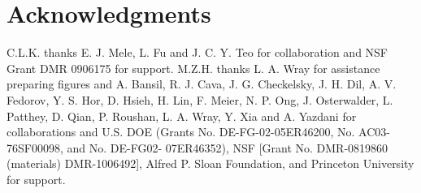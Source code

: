 \documentclass[twocolumn,floatfix,showpacs,rmp,aps]{revtex4}
\begin{document}
	\section*{Acknowledgments} C.L.K. thanks E. J. Mele, L. Fu and
	J. C. Y. Teo for collaboration and NSF Grant DMR 0906175 for support.
	M.Z.H. thanks L. A. Wray for assistance preparing figures and
	A. Bansil, R. J. Cava, J. G. Checkelsky, J. H. Dil, A.
	V. Fedorov, Y. S. Hor, D. Hsieh, H. Lin, F. Meier, N. P. Ong, J.
	Osterwalder, L. Patthey, D. Qian, P. Roushan, L. A. Wray, Y. Xia and A. Yazdani  for
	collaborations and U.S. DOE (Grants No. DE-FG-02-05ER46200, No. AC03-76SF00098, and No. DE-FG02-
	07ER46352), NSF [Grant No. DMR-0819860 (materials)
	DMR-1006492], Alfred P. Sloan Foundation, and Princeton
	University for support.
	
	
	
\end{document}
